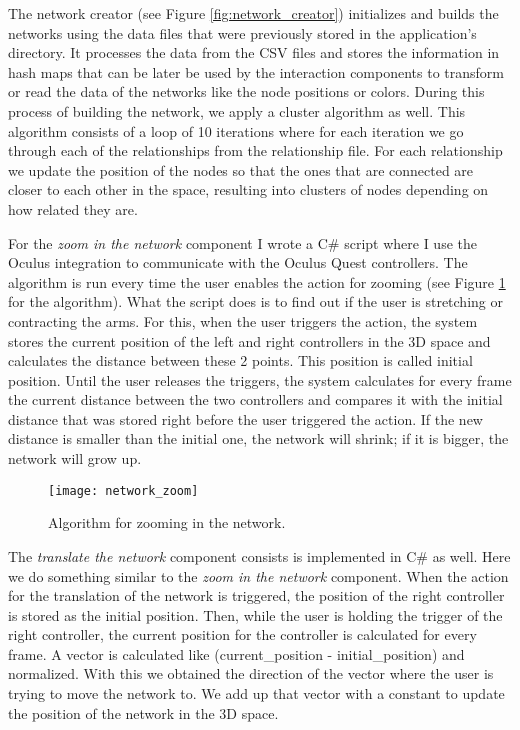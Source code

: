 The network creator (see Figure \ref{fig:network_creator}) initializes and builds the networks using the data files that were previously stored in the application's directory. It processes the data from the CSV files and stores the information in hash maps that can be later be used by the interaction components to transform or read the data of the networks like the node positions or colors. During this process of building the network, we apply a cluster algorithm as well. This algorithm consists of a loop of 10 iterations where for each iteration we go through each of the relationships from the relationship file. For each relationship we update the position of the nodes so that the ones that are connected are closer to each other in the space, resulting into clusters of nodes depending on how related they are.

For the \textit{zoom in the network} component I wrote a C\# script where I use the Oculus integration to communicate with the Oculus Quest controllers. The algorithm is run every time the user enables the action for zooming (see Figure \ref{fig:network_zoom} for the algorithm). What the script does is to find out if the user is stretching or contracting the arms. For this, when the user triggers the action, the system stores the current position of the left and right controllers in the 3D space and calculates the distance between these 2 points. This position is called initial position. Until the user releases the triggers, the system calculates for every frame the current distance between the two controllers and compares it with the initial distance that was stored right before the user triggered the action. If the new distance is smaller than the initial one, the network will shrink; if it is bigger, the network will grow up.

\begin{figure}[h!]
    \centering%
    \texttt{[image: network\_zoom]}
    \caption{Algorithm for zooming in the network.}
    \label{fig:network_zoom}
\end{figure}%

The \textit{translate the network} component consists is implemented in C\# as well. Here we do something similar to the \textit{zoom in the network} component. When the action for the translation of the network is triggered, the position of the right controller is stored as the initial position. Then, while the user is holding the trigger of the right controller, the current position for the controller is calculated for every frame. A vector is calculated like (current\_position - initial\_position) and normalized. With this we obtained the direction of the vector where the user is trying to move the network to. We add up that vector with a constant to update the position of the network in the 3D space.

